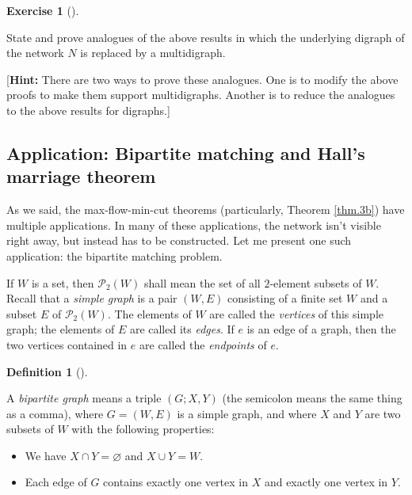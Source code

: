 \documentclass[numbers=enddot,12pt,final,onecolumn,notitlepage]{scrartcl}%
\newcounter{exer}
\theoremstyle{definition}
\newtheorem{defi}[theo]{Definition}
\newenvironment{definition}[1][]
{\begin{defi}[#1]\begin{leftbar}}
{\end{leftbar}\end{defi}}
\newtheorem{exmp}[exer]{Exercise}
\newenvironment{exercise}[1][]
{\begin{exmp}[#1]\begin{leftbar}}
{\end{leftbar}\end{exmp}}
\begin{document}
\begin{exercise}
State and prove analogues of the above results in which the underlying digraph
of the network $N$ is replaced by a multidigraph.

[\textbf{Hint:} There are two ways to prove these analogues. One is to modify
the above proofs to make them support multidigraphs. Another is to reduce the
analogues to the above results for digraphs.]
\end{exercise}

\subsection{\label{sect.hall}Application: Bipartite matching and Hall's
marriage theorem}

As we said, the max-flow-min-cut theorems (particularly, Theorem \ref{thm.3b})
have multiple applications. In many of these applications, the network isn't
visible right away, but instead has to be constructed. Let me present one such
application: the bipartite matching problem.

If $W$ is a set, then $\mathcal{P}_{2}\left(  W\right)  $ shall mean the set
of all $2$-element subsets of $W$. Recall that a \textit{simple graph} is a
pair $\left(  W,E\right)  $ consisting of a finite set $W$ and a subset $E$ of
$\mathcal{P}_{2}\left(  W\right)  $. The elements of $W$ are called the
\textit{vertices} of this simple graph; the elements of $E$ are called its
\textit{edges}. If $e$ is an edge of a graph, then the two vertices contained
in $e$ are called the \textit{endpoints} of $e$.

\begin{definition}
\label{def.bipgraph}A \textit{bipartite graph} means a triple $\left(
G;X,Y\right)  $ (the semicolon means the same thing as a comma), where
$G=\left(  W,E\right)  $ is a simple graph, and where $X$ and $Y$ are two
subsets of $W$ with the following properties:

\begin{itemize}
\item We have $X\cap Y=\varnothing$ and $X\cup Y=W$.

\item Each edge of $G$ contains exactly one vertex in $X$ and exactly one
vertex in $Y$.
\end{itemize}
\end{definition}
\end{document}
